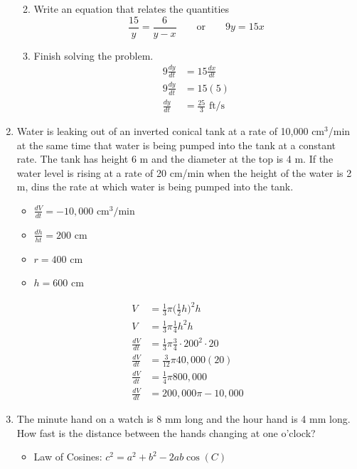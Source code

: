 \documentclass{article}
\begin{document}
\begin{enumerate}
\begin{enumerate}
\begin{center}
		\end{center}
			\item Write an equation that relates the quantities
				$$\frac{15}{y}=\frac{6}{y-x} \qquad \text{or} \qquad 9y=15x$$
			\item Finish solving the problem.
				$$\begin{align}
					9\frac{dy}{dt}&=15\frac{dx}{dt}\\
					9\frac{dy}{dt}&= 15(5)\\
					\frac{dy}{dt}&= \frac{25}{3} \text{ ft/s}
				\end{align}$$
		\end{enumerate}
\setcounter{enumi}{25}
	\item Water is leaking out of an inverted conical tank at a rate of 10,000 $\text{cm}^3$/min at the same time that water is being pumped into the tank at a constant rate. The tank has height 6 m and the diameter at the top is 4 m. If the water level is rising at a rate of 20 cm/min when the height of the water is 2 m, dins the rate at which water is being pumped into the tank. \newline
	\begin{itemize}
		\item $\frac{dV}{dt}=-10,000 \text{ cm}^3\text{/min}$
		\item $\frac{dh}{ht}= 200 \text{ cm}$
		\item $r=400$ cm
		\item $h=600$ cm
	\end{itemize}
	$$\begin{align}
		V&= \frac{1}{3}\pi\Big(\frac{1}{2}h\Big)^2h \\
		V&= \frac{1}{3}\pi \frac{1}{4}h^2 h \\
		\frac{dV}{dt} &= \frac{1}{3}\pi \frac{3}{4}\cdot 200^2 \cdot 20\\
		\frac{dV}{dt} &= \frac{3}{12}\pi 40,000(20)\\
		\frac{dV}{dt} &= \frac{1}{4}\pi 800,000\\
		\frac{dV}{dt} &= \boxed{200,000\pi - 10,000}
	\end{align}$$
\setcounter{enumi}{43}
	\item The minute hand on a watch is 8 mm long and the hour hand is 4 mm long. How fast is the distance between the hands changing at one o'clock?\newline
	\begin{itemize}
		\item Law of Cosines: $c^2=a^2+b^2-2ab \cos(C)$
	\end{itemize}

\end{enumerate}
\end{document}
